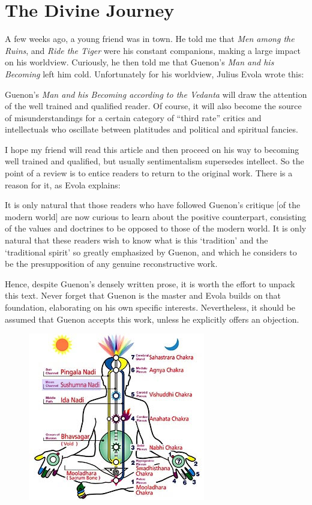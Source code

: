 \section{The Divine Journey}

A few weeks ago, a young friend was in town. He told me that \textit{Men among the Ruins}, and \textit{Ride the Tiger} were his constant companions, making a large impact on his worldview. Curiously, he then told me that Guenon's \textit{Man and his Becoming} left him cold. Unfortunately for his worldview, Julius Evola wrote this:

\begin{quotex}
Guenon's \textit{Man and his Becoming according to the Vedanta} will draw the attention of the well trained and qualified reader. Of course, it will also become the source of misunderstandings for a certain category of “third rate” critics and intellectuals who oscillate between platitudes and political and spiritual fancies. 

\end{quotex}
I hope my friend will read this article and then proceed on his way to becoming well trained and qualified, but usually sentimentalism supersedes intellect. So the point of a review is to entice readers to return to the original work. There is a reason for it, as Evola explains:

\begin{quotex}
It is only natural that those readers who have followed Guenon's critique [of the modern world] are now curious to learn about the positive counterpart, consisting of the values and doctrines to be opposed to those of the modern world. It is only natural that these readers wish to know what is this `tradition' and the `traditional spirit' so greatly emphasized by Guenon, and which he considers to be the presupposition of any genuine reconstructive work. 

\end{quotex}
Hence, despite Guenon's densely written prose, it is worth the effort to unpack this text. Never forget that Guenon is the master and Evola builds on that foundation, elaborating on his own specific interests. Nevertheless, it should be assumed that Guenon accepts this work, unless he explicitly offers an objection.

\begin{figure}
 \includegraphics[scale=.5]{a20120823TheDivineJourney-img001.jpg} 
\end{figure}

